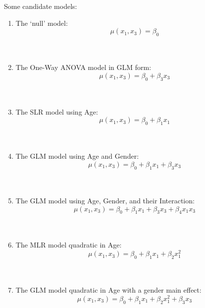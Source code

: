 Some candidate models:
\begin{enumerate}
\item The `null' model:
$$\mu(x_1,x_3) = \beta_0$$~\\~\\
\item The One-Way ANOVA model in GLM form:
$$\mu(x_1,x_3) = \beta_0 + \beta_3 x_3$$~\\~\\
\item The SLR model using Age:
$$\mu(x_1,x_3) = \beta_0 + \beta_1 x_1$$~\\~\\
\item The GLM model using Age and Gender:
$$\mu(x_1,x_3) = \beta_0 + \beta_1 x_1 + \beta_3 x_3$$~\\~\\
\item The GLM model using Age, Gender, and their Interaction:
$$\mu(x_1,x_3) = \beta_0 + \beta_1 x_1 + \beta_3 x_3+\beta_4x_1x_3$$~\\~\\
\item The MLR model quadratic in Age:
$$\mu(x_1,x_3) = \beta_0 + \beta_1 x_1+ \beta_2 x_1^2 $$~\\~\\
\item The GLM model quadratic in Age with a gender main effect:
$$\mu(x_1,x_3) = \beta_0 + \beta_1 x_1+ \beta_2 x_1^2+ \beta_3 x_3$$~\\~\\~\\~\\~\\~\\~\\~\\~\\

\end{enumerate}
